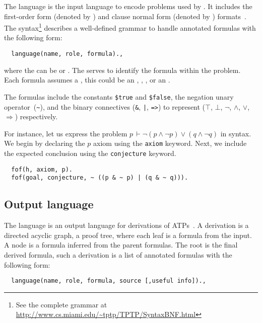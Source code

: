 \documentclass[../main.tex]{subfiles}
\begin{document}
The \TPTP language is the input language to encode problems used by \Metis.
It includes the first-order form (denoted by ) and clause normal form (denoted by ) formats~\cite{sutcliffe2009}.
The \TPTP syntax\footnote{See the complete grammar
at \url{http://www.cs.miami.edu/~tptp/TPTP/SyntaxBNF.html}} describes a well-defined grammar to handle annotated
formulas with the following form:

\begin{verbatim}
  language(name, role, formula).,
\end{verbatim}

where the  can be  or . The
 serves to identify the formula within the problem. Each
formula assumes a , this could be an ,
, ,  or an
.

The formulas include the constants
\verb!$true! and \verb!$false!, the negation unary
operator~(\verb!~!), and the binary connectives
(\verb!&!, \verb!|!, \verb!=>!) to represent
($⊤$, $⊥$, $¬$, $∧$, $∨$, $⇒$) respectively.

\begin{myexamplenum}
  For instance, let us express the problem
  $p\, ⊢ ¬ (p ∧ ¬ p) ∨ (q ∧ ¬ q)$ in \TPTP syntax. We begin by
  declaring the $p$ axiom using the \verb!axiom!  keyword. Next, we
  include the expected conclusion using the \verb!conjecture! keyword.

\begin{verbatim}
  fof(h, axiom, p).
  fof(goal, conjecture, ~ ((p & ~ p) | (q & ~ q))).
\end{verbatim}

\end{myexamplenum}


\subsection{Output language}
\label{ssec:output-language}

The \TSTP language is an output language for derivations of
ATPs~\cite{Sutcliffe-Schulz-Claessen-VanGelder-2006}.
A \TSTP derivation is a directed acyclic graph, a proof tree,
where each leaf is a formula from the \TPTP input. A node is a formula
inferred from the parent formulas. The root is the final derived formula,
such a derivation is a list of annotated formulas with the following form:

\begin{verbatim}
  language(name, role, formula, source [,useful info]).,
\end{verbatim}
\end{document}

